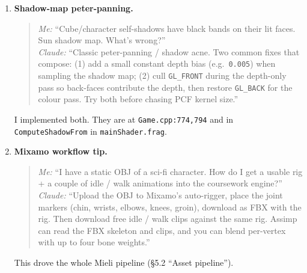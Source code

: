 \documentclass[11pt,a4paper]{article}
\begin{document}
\begin{enumerate}
  \item \textbf{Shadow-map peter-panning.}
    \begin{quote}\small
      \textit{Me:} ``Cube/character self-shadows have black bands on
      their lit faces. Sun shadow map. What's wrong?''\\[0.3em]
      \textit{Claude:} ``Classic peter-panning / shadow acne. Two
      common fixes that compose: (1) add a small constant depth bias
      (e.g.\ \texttt{0.005}) when sampling the shadow map; (2) cull
      \texttt{GL\_FRONT} during the depth-only pass so back-faces
      contribute the depth, then restore \texttt{GL\_BACK} for the
      colour pass. Try both before chasing PCF kernel size.''
    \end{quote}
    I implemented both. They are at \texttt{Game.cpp:774,794} and in
    \texttt{ComputeShadowFrom} in \texttt{mainShader.frag}.

  \item \textbf{Mixamo workflow tip.}
    \begin{quote}\small
      \textit{Me:} ``I have a static OBJ of a sci-fi character. How do
      I get a usable rig + a couple of idle / walk animations into the
      coursework engine?''\\[0.3em]
      \textit{Claude:} ``Upload the OBJ to Mixamo's auto-rigger, place
      the joint markers (chin, wrists, elbows, knees, groin), download
      as FBX with the rig. Then download free idle / walk clips against
      the same rig. Assimp can read the FBX skeleton and clips, and
      you can blend per-vertex with up to four bone weights.''
    \end{quote}
    This drove the whole Mieli pipeline (\S5.2 ``Asset pipeline'').
\end{enumerate}
\end{document}
